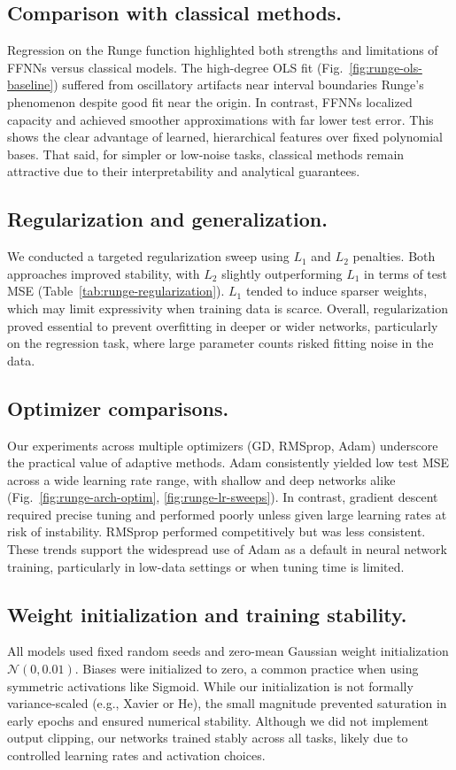 \documentclass[amssymb,twocolumn,aps]{revtex4}
\begin{document}
\subsection{Comparison with classical methods.}  
Regression on the Runge function highlighted both strengths and limitations of FFNNs versus classical models. The high-degree OLS fit (Fig.~\ref{fig:runge-ols-baseline}) suffered from oscillatory artifacts near interval boundaries Runge’s phenomenon despite good fit near the origin. In contrast, FFNNs localized capacity and achieved smoother approximations with far lower test error. This shows the clear advantage of learned, hierarchical features over fixed polynomial bases. That said, for simpler or low-noise tasks, classical methods remain attractive due to their interpretability and analytical guarantees.

\subsection{Regularization and generalization.}  
We conducted a targeted regularization sweep using $L_1$ and $L_2$ penalties. Both approaches improved stability, with $L_2$ slightly outperforming $L_1$ in terms of test MSE (Table~\ref{tab:runge-regularization}). $L_1$ tended to induce sparser weights, which may limit expressivity when training data is scarce. Overall, regularization proved essential to prevent overfitting in deeper or wider networks, particularly on the regression task, where large parameter counts risked fitting noise in the data.

\subsection{Optimizer comparisons.}  
Our experiments across multiple optimizers (GD, RMSprop, Adam) underscore the practical value of adaptive methods. Adam consistently yielded low test MSE across a wide learning rate range, with shallow and deep networks alike (Fig.~\ref{fig:runge-arch-optim}, \ref{fig:runge-lr-sweeps}). In contrast, gradient descent required precise tuning and performed poorly unless given large learning rates at risk of instability. RMSprop performed competitively but was less consistent. These trends support the widespread use of Adam as a default in neural network training, particularly in low-data settings or when tuning time is limited.

\subsection{Weight initialization and training stability.}  
All models used fixed random seeds and zero-mean Gaussian weight initialization $\mathcal{N}(0, 0.01)$. Biases were initialized to zero, a common practice when using symmetric activations like Sigmoid. While our initialization is not formally variance-scaled (e.g., Xavier or He), the small magnitude prevented saturation in early epochs and ensured numerical stability. Although we did not implement output clipping, our networks trained stably across all tasks, likely due to controlled learning rates and activation choices.
\end{document}
